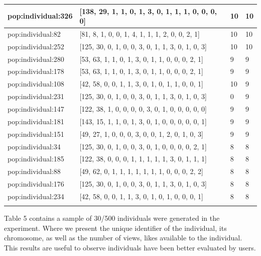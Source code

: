\begin{table}
\begin{tabular}{p{3cm} p{4cm} p{3cm} p{3cm}}
\small{pop:individual:326} & \small{[138, 29, 1, 1, 0, 1, 3, 0, 1, 1, 1, 0, 0, 0, 0]} 
& \small{10} & \small{10}\\ \hline 
\small{pop:individual:82} & \small{[81, 8, 1, 0, 0, 1, 4, 1, 1, 1, 2, 0, 0, 2, 1]} 
& \small{10} & \small{10}\\ \hline 
\small{pop:individual:252} & \small{[125, 30, 0, 1, 0, 0, 3, 0, 1, 1, 3, 0, 1, 0, 3]} 
& \small{10} & \small{10}\\ \hline 
\small{pop:individual:280} & \small{[53, 63, 1, 1, 0, 1, 3, 0, 1, 1, 0, 0, 0, 2, 1]} 
& \small{9} & \small{9}\\ \hline 
\small{pop:individual:178} & \small{[53, 63, 1, 1, 0, 1, 3, 0, 1, 1, 0, 0, 0, 2, 1]} 
& \small{9} & \small{9}\\ \hline 
\small{pop:individual:108} & \small{[42, 58, 0, 0, 1, 1, 3, 0, 1, 0, 1, 1, 0, 0, 1]} 
& \small{10} & \small{9}\\ \hline 
\small{pop:individual:231} & \small{[125, 30, 0, 1, 0, 0, 3, 0, 1, 1, 3, 0, 1, 0, 3]} 
& \small{0} & \small{9}\\ \hline 
\small{pop:individual:147} & \small{[122, 38, 1, 0, 0, 0, 0, 3, 0, 1, 0, 0, 0, 0, 0]} 
& \small{9} & \small{9}\\ \hline 
\small{pop:individual:181} & \small{[143, 15, 1, 1, 0, 1, 3, 0, 1, 0, 0, 0, 0, 0, 1]} 
& \small{9} & \small{9}\\ \hline 
\small{pop:individual:151} & \small{[49, 27, 1, 0, 0, 0, 3, 0, 0, 1, 2, 0, 1, 0, 3]} 
& \small{9} & \small{9}\\ \hline 
\small{pop:individual:34} & \small{[125, 30, 0, 1, 0, 0, 3, 0, 1, 0, 0, 0, 0, 2, 1]} 
& \small{8} & \small{8}\\ \hline 
\small{pop:individual:185} & \small{[122, 38, 0, 0, 0, 1, 1, 1, 1, 1, 3, 0, 1, 1, 1]} 
& \small{8} & \small{8}\\ \hline 
\small{pop:individual:88} & \small{[49, 62, 0, 1, 1, 1, 1, 1, 1, 1, 0, 0, 0, 2, 2]} 
& \small{8} & \small{8}\\ \hline 
\small{pop:individual:176} & \small{[125, 30, 0, 1, 0, 0, 3, 0, 1, 1, 3, 0, 1, 0, 3]} 
& \small{8} & \small{8}\\ \hline 
\small{pop:individual:234} & \small{[42, 58, 0, 0, 1, 1, 3, 0, 1, 0, 1, 0, 0, 0, 1]} 
& \small{8} & \small{8}\\ \hline    
\noalign{\smallskip}\hline
\end{tabular}
\end{table}

Table 5 contains a sample of 30/500 individuals were generated in the
experiment. Where we present the unique identifier of the individual, its
chromosome, as well as the number of views, likes available to the individual.
This results are useful to observe individuals have been better evaluated by
users.

